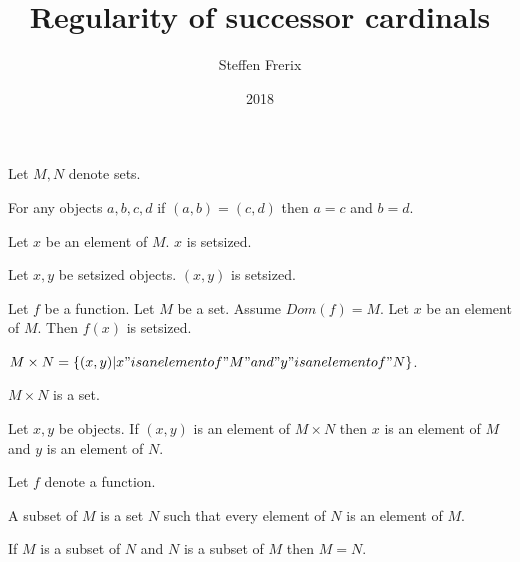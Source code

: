 \documentclass{article}
\title{Regularity of successor cardinals}
\author{Steffen Frerix}
\date{2018}
\newcommand{\Prod}[2]{#1\times #2}
\begin{document}

  \maketitle

  \begin{forthel}

    Let $M,N$ denote sets.

    \begin{axiom}
      For any objects $a,b,c,d$ if $(a,b) = (c,d)$ then $a = c$ and $b = d$.
    \end{axiom}

    \begin{axiom}
      Let $x$ be an element of $M$. $x$ is setsized.
    \end{axiom}

    \begin{axiom}
      Let $x,y$ be setsized objects. $(x, y)$ is setsized.
    \end{axiom}

    \begin{axiom}
      Let $f$ be a function. Let $M$ be a set. Assume $Dom(f) = M$.
      Let $x$ be an element of $M$. Then $f(x)$ is setsized.
    \end{axiom}

    \begin{definition}
      $\Prod{M}{N} = \{(x,y) | x "is an element of" M "and" y "is an element of" N\}$.
    \end{definition}

    \begin{axiom}
      $\Prod{M}{N}$ is a set.
    \end{axiom}

    \begin{lemma}
      Let $x,y$ be objects. If $(x,y)$ is an element of $\Prod{M}{N}$ then $x$ is an element of $M$ and $y$ is an element of $N$.
    \end{lemma}

    Let $f$ denote a function.

    \begin{definition}
      A subset of $M$ is a set $N$ such that every element of $N$ is an element of $M$.
    \end{definition}

    \begin{axiom}[Extensionality]
      If $M$ is a subset of $N$ and $N$ is a subset of $M$ then $M = N$.
    \end{axiom}


\end{forthel}
\end{document}

